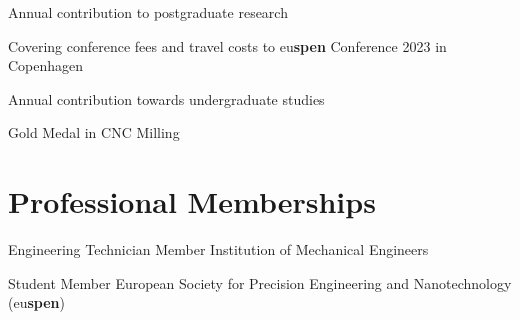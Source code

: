 \documentclass{cv}
\begin{document}
Annual contribution to postgraduate research

Covering conference fees and travel costs to eu\textbf{spen} Conference 2023 in Copenhagen 


Annual contribution towards undergraduate studies

 Gold Medal in CNC Milling 

\section{Professional Memberships}

Engineering Technician Member Institution of Mechanical Engineers

Student Member European Society for Precision Engineering and Nanotechnology (eu\textbf{spen})
\end{document}
